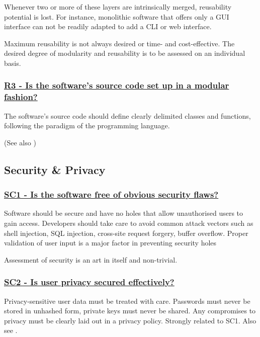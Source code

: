 \documentclass[a4paper,11pt]{article}
\newcommand{\criterion}[2]{\subsubsection*{\underline{#1 - #2}}\label{id:#1}}
\newcommand\CheckTable{%
  \begin{tabular}{ccccc}
    No & Minimal & Adequate & Good & Perfect \\
    0 & 1 & 2 & 3 & 4 \\
    \hline
    $\square$ & $\square$ & $\square$ & $\square$ & $\square$ \\
  \end{tabular}%
}
\newcommand{\refcrit}[1]{%
 \framebox[1.1\width]{\hyperref[id:#1]{#1}}
}
\begin{document}
Whenever two or more of these layers are intrinsically merged, reusability potential is lost.
For instance, monolithic software that offers only a GUI interface can not be
readily adapted to add a CLI or web interface.

Maximum reusability is not always desired or time- and cost-effective. The
desired degree of modularity and reusability is to be assessed on an
individual basis.


\newcommand{\rThreeID}{R3}
\newcommand{\rThreeText}{Is the software's source code set up in a modular fashion?}
\criterion{\rThreeID}{\rThreeText}
%
%
%

The software's source code should define clearly delimited classes and
functions, following the paradigm of the programming language. 

(See also \refcrit{AN1})


\subsection{Security \& Privacy}\label{sec:sec}

\newcommand{\scOneID}{SC1}
\newcommand{\scOneText}{Is the software free of obvious security flaws?}
\criterion{\scOneID}{\scOneText}

Software should be secure and have no holes that allow unauthorised users to
gain access. Developers should take care to avoid common attack vectors such as
shell injection, SQL injection, cross-site request forgery, buffer overflow.
Proper validation of user input is a major factor in preventing security holes

Assessment of security is an art in itself and non-trivial. 


\newcommand{\scTwoID}{SC2}
\newcommand{\scTwoText}{Is user privacy secured effectively?}
\criterion{\scTwoID}{\scTwoText}

Privacy-sensitive user data must be treated with care. Passwords must never be
stored in unhashed form, private keys must never be shared. Any compromises to
privacy must be clearly laid out in a privacy policy.  Strongly related to SC1.
Also see \refcrit{AC3}.
\end{document}
